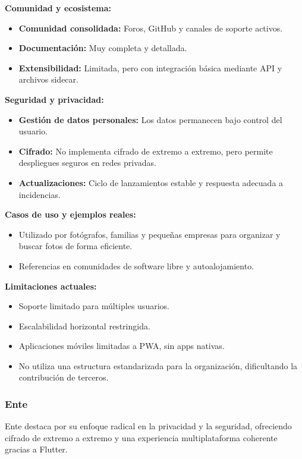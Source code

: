 \textbf{Comunidad y ecosistema:}
\begin{itemize}
    \item \textbf{Comunidad consolidada:} Foros, GitHub y canales de soporte activos.
    \item \textbf{Documentación:} Muy completa y detallada.
    \item \textbf{Extensibilidad:} Limitada, pero con integración básica mediante API y archivos sidecar.
\end{itemize}

\textbf{Seguridad y privacidad:}
\begin{itemize}
    \item \textbf{Gestión de datos personales:} Los datos permanecen bajo control del usuario.
    \item \textbf{Cifrado:} No implementa cifrado de extremo a extremo, pero permite despliegues seguros en redes privadas.
    \item \textbf{Actualizaciones:} Ciclo de lanzamientos estable y respuesta adecuada a incidencias.
\end{itemize}

\textbf{Casos de uso y ejemplos reales:}
\begin{itemize}
    \item Utilizado por fotógrafos, familias y pequeñas empresas para organizar y buscar fotos de forma eficiente.
    \item Referencias en comunidades de software libre y autoalojamiento.
\end{itemize}

\textbf{Limitaciones actuales:}
\begin{itemize}
    \item Soporte limitado para múltiples usuarios.
    \item Escalabilidad horizontal restringida.
    \item Aplicaciones móviles limitadas a PWA, sin apps nativas.
    \item No utiliza una estructura estandarizada para la organización, dificultando la contribución de terceros.
\end{itemize}

\subsubsection{Ente}

Ente destaca por su enfoque radical en la privacidad y la seguridad, ofreciendo cifrado de extremo a extremo y una experiencia multiplataforma coherente gracias a Flutter.

